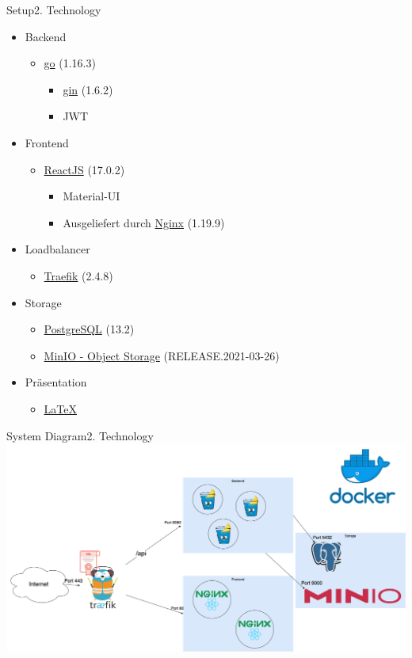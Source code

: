 \documentclass[aspectratio=169,20pt]{beamer}
\begin{document}
\begin{frame}{Setup}{2. Technology}
	\begin{itemize}
		\item{Backend}
		\begin{itemize}
			\item{\href{https://golang.org/}{go} (1.16.3)}
			\begin{itemize}
				\item{\href{https://gin-gonic.com/}{gin} (1.6.2)}
				\item{JWT}
			\end{itemize}
		\end{itemize}
		\item{Frontend}
		\begin{itemize}
			\item{\href{https://reactjs.org/versions/}{ReactJS} (17.0.2)}
			\begin{itemize}
				\item{Material-UI}
				\item{Ausgeliefert durch \href{https://nginx.org/}{Nginx} (1.19.9)}
			\end{itemize}
		\end{itemize}
		\item{Loadbalancer}

		\begin{itemize}
			\item{\href{https://traefik.io/}{Traefik} (2.4.8)}
		\end{itemize} 
		\item{Storage}
		\begin{itemize}
			\item{\href{https://www.postgresql.org/}{PostgreSQL} (13.2)}
			\item{\href{https://min.io/}{MinIO - Object Storage} (RELEASE.2021-03-26)}
		\end{itemize}
		\item{Präsentation}
		\begin{itemize}
			\item{\href{https://github.com/ost-fh/Latex-Beamer-Theme}{LaTeX}}
		\end{itemize}       
	\end{itemize}

\end{frame}




\begin{frame}{System Diagram}{2. Technology}
	\includegraphics[scale=0.45]{Infrastruktur}	
\end{frame}
\end{document}
